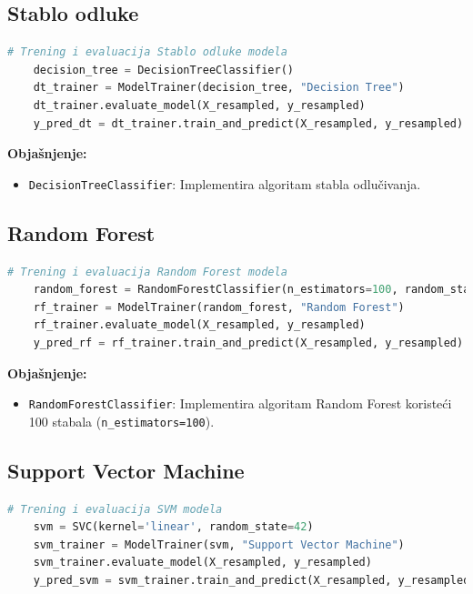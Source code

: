 \documentclass[zavrsnirad,upload]{fer}
\begin{document}
\subsection{Stablo odluke}

\begin{lstlisting}[language=Python, caption={Trening i evaluacija Stablo odluke modela}]
	# Trening i evaluacija Stablo odluke modela
	decision_tree = DecisionTreeClassifier()
	dt_trainer = ModelTrainer(decision_tree, "Decision Tree")
	dt_trainer.evaluate_model(X_resampled, y_resampled)
	y_pred_dt = dt_trainer.train_and_predict(X_resampled, y_resampled)
\end{lstlisting}

\noindent \textbf{Objašnjenje:}
\begin{itemize}
	\item \texttt{DecisionTreeClassifier}: Implementira algoritam stabla odlučivanja.
\end{itemize}

\subsection{Random Forest}

\begin{lstlisting}[language=Python, caption={Trening i evaluacija Random Forest modela}]
	# Trening i evaluacija Random Forest modela
	random_forest = RandomForestClassifier(n_estimators=100, random_state=42)
	rf_trainer = ModelTrainer(random_forest, "Random Forest")
	rf_trainer.evaluate_model(X_resampled, y_resampled)
	y_pred_rf = rf_trainer.train_and_predict(X_resampled, y_resampled)
\end{lstlisting}

\noindent \textbf{Objašnjenje:}
\begin{itemize}
	\item \texttt{RandomForestClassifier}: Implementira algoritam Random Forest koristeći 100 stabala (\texttt{n\_estimators=100}).
\end{itemize}

\subsection{Support Vector Machine}

\begin{lstlisting}[language=Python, caption={Trening i evaluacija SVM modela}]
	# Trening i evaluacija SVM modela
	svm = SVC(kernel='linear', random_state=42)
	svm_trainer = ModelTrainer(svm, "Support Vector Machine")
	svm_trainer.evaluate_model(X_resampled, y_resampled)
	y_pred_svm = svm_trainer.train_and_predict(X_resampled, y_resampled)
\end{lstlisting}
\end{document}
